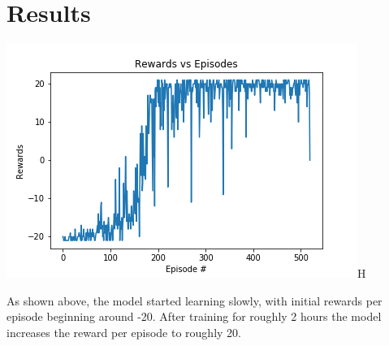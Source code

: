 \documentclass[10pt]{article}
\begin{document}
\section{Results}

\includegraphics{../submission/plot.png}H

As shown above, the model started learning slowly, with initial rewards per episode beginning around -20. After training for roughly 2 hours the model increases the reward per episode to roughly 20.




\end{document}
